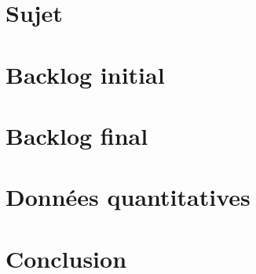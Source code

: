 \documentclass[a4paper,11pt]{report}
\begin{document}
\chapter{Sujet}


\chapter{Backlog initial}


\chapter{Backlog final}


\chapter{Données quantitatives}


\chapter{Conclusion}

\end{document}
